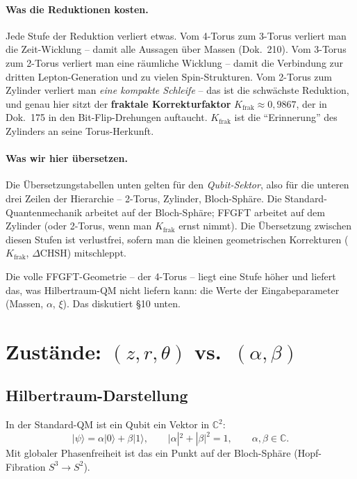 \paragraph{Was die Reduktionen kosten.}
Jede Stufe der Reduktion verliert etwas. Vom 4-Torus zum 3-Torus
verliert man die Zeit-Wicklung -- damit alle Aussagen über Massen
(Dok.~210). Vom 3-Torus zum 2-Torus verliert man eine räumliche
Wicklung -- damit die Verbindung zur dritten Lepton-Generation und
zu vielen Spin-Strukturen. Vom 2-Torus zum Zylinder verliert man
\emph{eine kompakte Schleife} -- das ist die schwächste Reduktion,
und genau hier sitzt der \textbf{fraktale Korrekturfaktor}
$K_{\text{frak}} \approx 0{,}9867$, der in Dok.~175 in den
Bit-Flip-Drehungen auftaucht. $K_{\text{frak}}$ ist die
\enquote{Erinnerung} des Zylinders an seine Torus-Herkunft.

\paragraph{Was wir hier übersetzen.}
Die Übersetzungstabellen unten gelten für den \emph{Qubit-Sektor},
also für die unteren drei Zeilen der Hierarchie -- 2-Torus,
Zylinder, Bloch-Sphäre. Die Standard-Quantenmechanik arbeitet
auf der Bloch-Sphäre; FFGFT arbeitet auf dem Zylinder (oder
2-Torus, wenn man $K_{\text{frak}}$ ernst nimmt). Die Übersetzung
zwischen diesen Stufen ist verlustfrei, sofern man die kleinen
geometrischen Korrekturen ($K_{\text{frak}}$, $\Delta\text{CHSH}$)
mitschleppt.

Die volle FFGFT-Geometrie -- der 4-Torus -- liegt eine Stufe
höher und liefert das, was Hilbertraum-QM nicht liefern kann:
die Werte der Eingabeparameter (Massen, $\alpha$, $\xi$). Das
diskutiert §10 unten.

\section{\texorpdfstring{Zustände: $(z, r, \theta)$ vs.\ $(\alpha, \beta)$}{Zustaende: (z,r,theta) vs. (alpha,beta)}}

\subsection{Hilbertraum-Darstellung}

In der Standard-QM ist ein Qubit ein Vektor in $\mathbb{C}^2$:
\begin{equation}
  |\psi\rangle = \alpha|0\rangle + \beta|1\rangle,
  \qquad
  |\alpha|^2 + |\beta|^2 = 1,
  \qquad
  \alpha, \beta \in \mathbb{C}.
\end{equation}
Mit globaler Phasenfreiheit ist das ein Punkt auf der Bloch-Sphäre
(Hopf-Fibration $S^3 \to S^2$).

